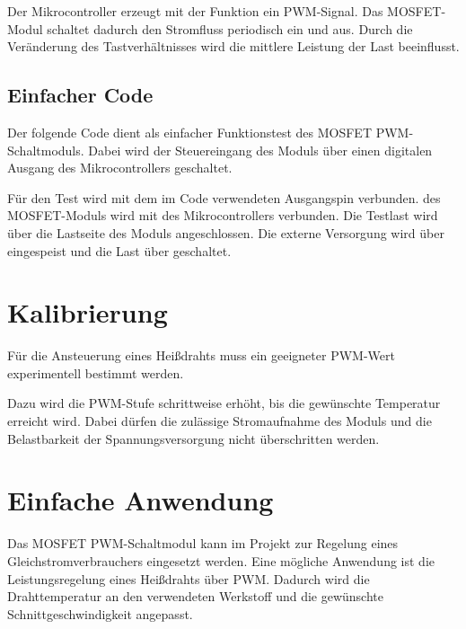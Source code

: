 Der Mikrocontroller erzeugt mit der Funktion  ein PWM-Signal. 
Das MOSFET-Modul schaltet dadurch den Stromfluss periodisch ein und aus. 
Durch die Veränderung des Tastverhältnisses wird die mittlere Leistung der Last beeinflusst.

\subsection{Einfacher Code}

Der folgende Code dient als einfacher Funktionstest des MOSFET PWM-Schaltmoduls. 
Dabei wird der Steuereingang des Moduls über einen digitalen Ausgang des Mikrocontrollers geschaltet.

Für den Test wird  mit dem im Code verwendeten Ausgangspin verbunden. 
 des MOSFET-Moduls wird mit  des Mikrocontrollers verbunden. 
Die Testlast wird über die Lastseite des Moduls angeschlossen. 
Die externe Versorgung wird über  eingespeist und die Last über  geschaltet.

\begin{code}[H]
	\label{Code:MosfetSimpleSwitch}
\end{code}



\section{Kalibrierung}

Für die Ansteuerung eines Heißdrahts muss ein geeigneter PWM-Wert experimentell bestimmt werden.

Dazu wird die PWM-Stufe schrittweise erhöht, bis die gewünschte Temperatur erreicht wird. 
Dabei dürfen die zulässige Stromaufnahme des Moduls und die Belastbarkeit der Spannungsversorgung nicht überschritten werden.

\section{Einfache Anwendung}

Das MOSFET PWM-Schaltmodul kann im Projekt zur Regelung eines Gleichstromverbrauchers eingesetzt werden. 
Eine mögliche Anwendung ist die Leistungsregelung eines Heißdrahts über PWM. 
Dadurch wird die Drahttemperatur an den verwendeten Werkstoff und die gewünschte Schnittgeschwindigkeit angepasst.

